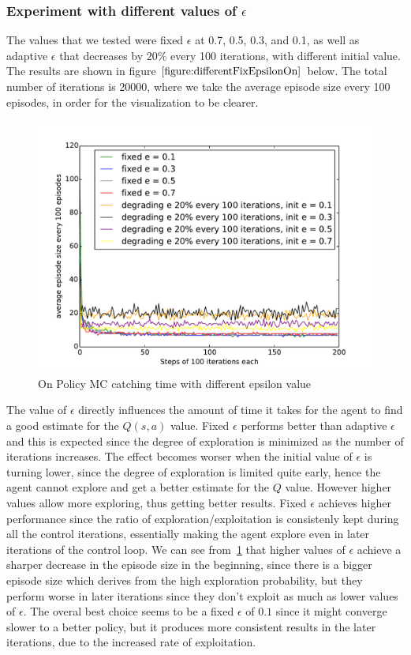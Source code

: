 \documentclass[paper=a4, fontsize=11pt]{scrartcl}
\numberwithin{equation}{section}		%
\numberwithin{figure}{section}			%
\numberwithin{table}{section}				%
\begin{document}
\subsubsection*{Experiment with different values of $\epsilon$}
The values that we tested were fixed $\epsilon$ at 0.7, 0.5, 0.3, and 0.1, as well as adaptive $\epsilon$ that decreases by $20\%$ every 100 iterations, with different initial value. The results are shown in figure $\ref{figure:differentFixEpsilonOn}$ below. The total number of iterations is  20000, where we take the average episode size every 100 episodes, in order for the visualization to be clearer. 
\begin{figure}[h] \centering
\includegraphics[scale=0.65]{on_policy_mc.pdf}
\caption{On Policy MC catching time with different epsilon value} \label{figure:differentFixEpsilonOn}
\end{figure}

The value of $\epsilon$ directly influences the amount of time it takes for the agent to find a good estimate for the $Q(s,a)$ value. Fixed $\epsilon$ performs better than adaptive $\epsilon$ and this is expected since the degree of exploration is minimized as the number of iterations increases. The effect becomes worser when the initial value of $\epsilon$ is turning lower, since the degree of exploration is limited quite early, hence the agent cannot explore and get a better estimate for the $Q$ value. However higher values allow more exploring, thus getting better results. Fixed $\epsilon$ achieves higher performance since the ratio of exploration/exploitation is consistenly kept during all the control iterations, essentially making the agent explore even in later iterations of the control loop.  We can see from~\ref{figure:differentFixEpsilonOn} that higher  values of $\epsilon$ achieve a sharper decrease in the episode size in the beginning, since there is a bigger episode size which derives from the high exploration probability, but they perform worse in later iterations since they don't exploit as much as lower values of $\epsilon$. The overal best choice seems to be a fixed $\epsilon$ of $0.1$ since it might converge slower to a better policy, but it produces more consistent results in the later iterations, due to the increased rate of exploitation. 
\end{document}
